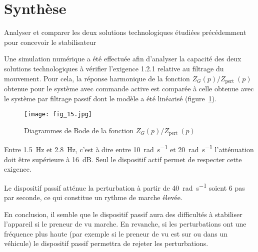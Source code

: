 
\section{\label{part:5}Synthèse}
\begin{obj}
Analyser et comparer les deux solutions technologiques étudiées précédemment pour concevoir le stabilisateur
\end{obj}

\ifprof
\else

Une simulation numérique a été effectuée afin d'analyser la capacité des deux solutions technologiques à vérifier l'exigence 1.2.1 relative au filtrage du mouvement. Pour cela, la réponse harmonique de la fonction $Z_{G}(p) / Z_{\text {pert }}(p)$ obtenue pour le système avec commande active est comparée à celle obtenue avec le système par filtrage passif dont le modèle a été linéarisé (figure~\ref{fig:15}).

\begin{figure}[H]
\centering
\texttt{[image: fig\_15.jpg]}
\caption{\label{fig:15}  Diagrammes de Bode de la fonction $Z_{G}(p) / Z_{\text {pert }}(p)$}
\end{figure}
\fi


\ifprof
\begin{corrige}
Entre \SI{1,5}{Hz} et \SI{2,8}{Hz}, c'est à dire entre \SI{10}{rad.s^{-1}} et \SI{20}{rad.s^{-1}} l'atténuation doit être supérieure à \SI{16}{dB}. Seul le dispositif actif permet de respecter cette exigence. 


Le dispositif passif atténue la perturbation à partir de \SI{40}{rad.s^{-1}} soient 6 pas par seconde, ce qui constitue un rythme de marche élevée.

En conclusion, il semble que le dispositif passif aura des difficultés à stabiliser l'appareil si le preneur de vu marche. En revanche, si les perturbations ont une fréquence plus haute (par exemple si le preneur de vu est sur ou dans un véhicule) le dispositif passif permettra de rejeter les perturbations. 

\end{corrige}
\else
\fi

